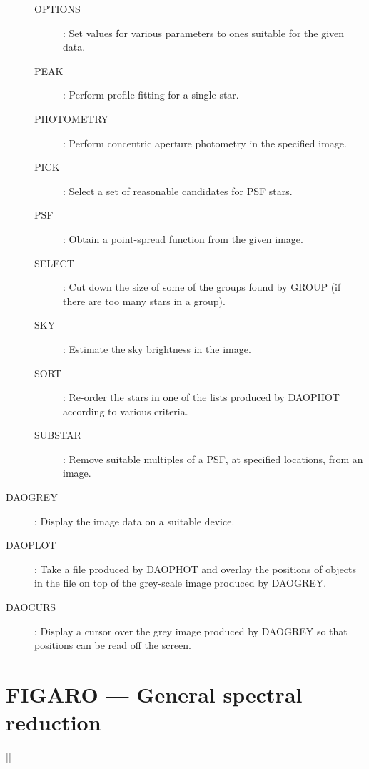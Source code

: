\begin{description}
\begin{description}
\item [OPTIONS] : Set values for various parameters to ones suitable for the
 given data.
\item [PEAK] : Perform profile-fitting for a single star.
\item [PHOTOMETRY] : Perform concentric aperture photometry in the specified
 image.
\item [PICK] : Select a set of reasonable candidates for PSF stars.
\item [PSF] : Obtain a point-spread function from the given image.
\item [SELECT] : Cut down the size of some of the groups found by GROUP (if
 there are too many stars in a group).
\item [SKY] : Estimate the sky brightness in the image.
\item [SORT] : Re-order the stars in one of the lists produced by DAOPHOT
 according to various criteria.
\item [SUBSTAR] : Remove suitable multiples of a PSF, at specified locations,
from an image.
\end{description}

\item [DAOGREY] : Display the image data on a suitable device.

\item [DAOPLOT] : Take a file produced by DAOPHOT and overlay the positions
 of objects in the file on top of the grey-scale image produced by DAOGREY.

\item [DAOCURS] : Display a cursor over the grey image produced by DAOGREY so
 that positions can be read off the screen.
\end{description}

\newpage

\section{FIGARO --- General spectral reduction}

\vspace{-10mm}

\hfill []

\vspace{2mm}

